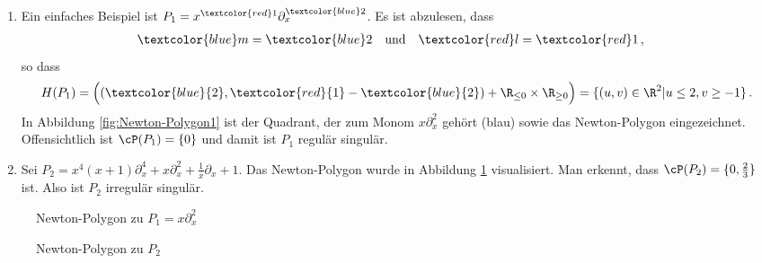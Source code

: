 \begin{defcor}
\begin{exmp} \label{exmp:Newton-Polygon}
\begin{enumerate}
\item Ein einfaches Beispiel ist
$P_1=x^{\textcolor{red}1}\partial_x^{\textcolor{blue}2}$.  Es ist abzulesen,
dass
\begin{align*}
\textcolor{blue}m &= \textcolor{blue}2 &
\text{und}&&
\textcolor{red}l  &= \textcolor{red}1 \,,
\end{align*}
so dass
\[
H(P_1)=\Big( (\textcolor{blue}{2},\textcolor{red}{1}-\textcolor{blue}{2}) +
\R_{\leq 0}\times \R_{\geq 0} \Big) =\{(u,v)\in\R^2|u\leq 2, v\geq -1\} \,.
\]
In Abbildung \ref{fig:Newton-Polygon1} ist der Quadrant, der zum Monom
$x\partial_x^2$ gehört (blau) sowie das Newton-Polygon eingezeichnet.
Offensichtlich ist $\cP(P_1)=\{0\}$ und damit ist $P_1$ regulär singulär.
\item
\begin{comment}
\cite[Bsp 5.3. 2.]{ZulaBarbara}
\end{comment}
Sei $P_2=x^4(x+1)\partial_x^4+x\partial_x^2+\frac{1}{x}\partial_x+1$.
Das Newton-Polygon wurde in Abbildung \ref{fig:Newton-Polygon2} visualisiert.
Man erkennt, dass $\cP(P_2)=\{0,\frac{2}{3}\}$ ist.
Also ist $P_2$ irregulär singulär.
\end{enumerate}
\begin{figure}[htbp] 
  \begin{minipage}[hbt]{0,49\textwidth}
  \begin{center}
  \end{center}
  \caption{Newton-Polygon zu $P_1=x\partial_x^2$}
  \label{fig:Newton-Polygon1}
  \end{minipage}
  \begin{minipage}[hbt]{0,49\textwidth}
  \begin{center}
  \end{center}
  \caption{Newton-Polygon zu $P_2$}
  \label{fig:Newton-Polygon2}
  \end{minipage}
\end{figure}
\end{exmp}


\end{defcor}
